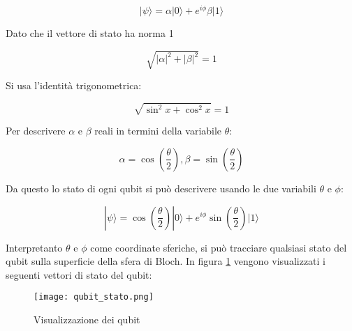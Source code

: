 \[
  | \psi \rangle
  = \alpha | 0 \rangle
  + e^{i\phi} \beta | 1 \rangle
\]

Dato che il vettore di stato ha norma 1

\[
  \sqrt{
    |\alpha|^2
    + |\beta|^2
  }
  = 1
\]

Si usa l'identità trigonometrica:

\[
  \sqrt{
    \sin^2 x
    + \cos^2 x
  }
  = 1
\]

Per descrivere \( \alpha \) e \( \beta \) reali in termini della variabile \( \theta \):

\[
  \alpha = \cos \left( \frac{\theta}{2} \right), 
  \beta = \sin \left( \frac{\theta}{2} \right)
\]

Da questo lo stato di ogni qubit si può descrivere usando le due variabili \(\theta\) e \(\phi\):

\[
  | \psi \rangle
  = \cos \left( \frac{\theta}{2} \right) | 0 \rangle
  + e^{i\phi} \sin \left( \frac{\theta}{2} \right) | 1 \rangle
\]

Interpretanto \(\theta\) e \(\phi\) come coordinate sferiche, si può tracciare qualsiasi stato del qubit sulla superficie della sfera di Bloch. In figura \ref{fig:qubit_stato} vengono visualizzati i seguenti vettori di stato del qubit:

\begin{figure}[h]
  \centering
  \texttt{[image: qubit\_stato.png]}
  \caption{Visualizzazione dei qubit}
  \label{fig:qubit_stato}
\end{figure}


